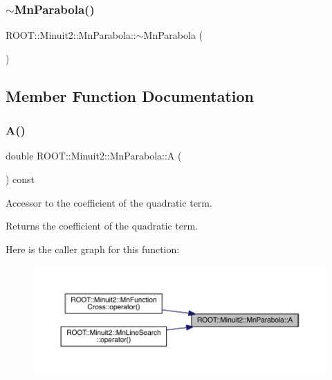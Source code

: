 \subsubsection{\texorpdfstring{$\sim$MnParabola()}{~MnParabola()}\hspace{0.1cm}{\footnotesize\ttfamily [3/3]}}
{\footnotesize\ttfamily R\+O\+O\+T\+::\+Minuit2\+::\+Mn\+Parabola\+::$\sim$\+Mn\+Parabola (\begin{DoxyParamCaption}{ }\end{DoxyParamCaption})\hspace{0.3cm}{\ttfamily [inline]}}



\subsection{Member Function Documentation}
\mbox{\label{classROOT_1_1Minuit2_1_1MnParabola_ae5ca4bea19ba4c0243ca70bb6e55e827}} 
\subsubsection{\texorpdfstring{A()}{A()}\hspace{0.1cm}{\footnotesize\ttfamily [1/3]}}
{\footnotesize\ttfamily double R\+O\+O\+T\+::\+Minuit2\+::\+Mn\+Parabola\+::A (\begin{DoxyParamCaption}{ }\end{DoxyParamCaption}) const\hspace{0.3cm}{\ttfamily [inline]}}

Accessor to the coefficient of the quadratic term.

\begin{DoxyReturn}{Returns}
the coefficient of the quadratic term. 
\end{DoxyReturn}
Here is the caller graph for this function\+:
\nopagebreak
\begin{figure}[H]
\begin{center}
\leavevmode
\includegraphics[width=350pt]{db/d7d/classROOT_1_1Minuit2_1_1MnParabola_ae5ca4bea19ba4c0243ca70bb6e55e827_icgraph}
\end{center}
\end{figure}
\mbox{\label{classROOT_1_1Minuit2_1_1MnParabola_ae5ca4bea19ba4c0243ca70bb6e55e827}} 
